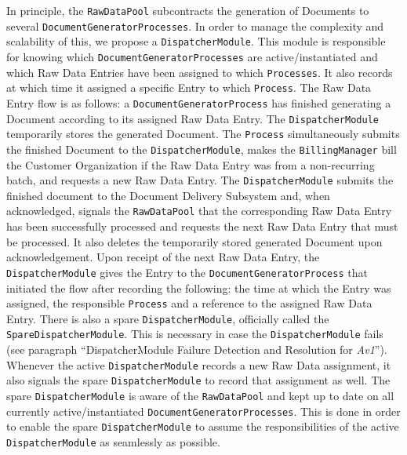 \documentclass[a4paper,10pt]{article}
\begin{document}
In principle, the \texttt{RawDataPool} subcontracts the generation of Documents to several \texttt{DocumentGeneratorProcesses}. In order to manage the complexity and scalability of this, we propose a \texttt{DispatcherModule}. This module is responsible for knowing which \texttt{Document\-Generator\-Processes} are active/instantiated and which Raw Data Entries have been assigned to which \texttt{Processes}. It also records at which time it assigned a specific Entry to which \texttt{Process}. The Raw Data Entry flow is as follows: a \texttt{DocumentGeneratorProcess} has finished generating a Document according to its assigned Raw Data Entry. The \texttt{DispatcherModule} temporarily stores the generated Document. The \texttt{Process} simultaneously submits the finished Document to the \texttt{DispatcherModule}, makes the \texttt{BillingManager} bill the Customer Organization if the Raw Data Entry was from a non-recurring batch, and requests a new Raw Data Entry. The \texttt{DispatcherModule} submits the finished document to the Document Delivery Subsystem and, when acknowledged, signals the \texttt{RawDataPool} that the corresponding Raw Data Entry has been successfully processed and requests the next Raw Data Entry that must be processed. It also deletes the temporarily stored generated Document upon acknowledgement. Upon receipt of the next Raw Data Entry, the \texttt{DispatcherModule} gives the Entry to the \texttt{DocumentGeneratorProcess} that initiated the flow after recording the following: the time at which the Entry was assigned, the responsible \texttt{Process} and a reference to the assigned Raw Data Entry. There is also a spare \texttt{DispatcherModule}, officially called the \texttt{SpareDispatcherModule}. This is necessary in case the \texttt{DispatcherModule} fails (see paragraph ``DispatcherModule Failure Detection and Resolution for \emph{Av1}''). Whenever the active \texttt{DispatcherModule} records a new Raw Data assignment, it also signals the spare \texttt{DispatcherModule} to record that assignment as well. The spare \texttt{DispatcherModule} is aware of the \texttt{RawDataPool} and kept up to date on all currently active/instantiated \texttt{DocumentGeneratorProcesses}. This is done in order to enable the spare \texttt{DispatcherModule} to assume the responsibilities of the active \texttt{DispatcherModule} as seamlessly as possible.
\end{document}
